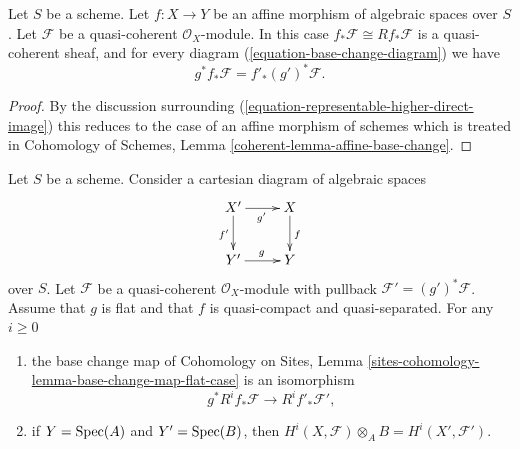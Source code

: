 \begin{lemma}
\label{lemma-affine-base-change}
Let $S$ be a scheme. Let $f : X \to Y$ be an affine morphism of algebraic
spaces over $S$. Let $\mathcal{F}$ be a quasi-coherent $\mathcal{O}_X$-module.
In this case $f_*\mathcal{F} \cong Rf_*\mathcal{F}$ is a quasi-coherent
sheaf, and for every diagram (\ref{equation-base-change-diagram})
we have
$$
g^*f_*\mathcal{F} = f'_*(g')^*\mathcal{F}.
$$
\end{lemma}

\begin{proof}
By the discussion surrounding
(\ref{equation-representable-higher-direct-image})
this reduces to the case of an affine morphism of schemes which
is treated in Cohomology of Schemes, Lemma
\ref{coherent-lemma-affine-base-change}.
\end{proof}

\begin{lemma}
\label{lemma-flat-base-change-cohomology}
Let $S$ be a scheme. Consider a cartesian diagram of algebraic spaces
$$
\xymatrix{
X' \ar[d]_{f'} \ar[r]_{g'} & X \ar[d]^f \\
Y' \ar[r]^g & Y
}
$$
over $S$.
Let $\mathcal{F}$ be a quasi-coherent $\mathcal{O}_X$-module
with pullback $\mathcal{F}' = (g')^*\mathcal{F}$.
Assume that $g$ is flat and that $f$ is quasi-compact and quasi-separated.
For any $i \geq 0$
\begin{enumerate}
\item the base change map of
Cohomology on Sites, Lemma
\ref{sites-cohomology-lemma-base-change-map-flat-case}
is an isomorphism
$$
g^*R^if_*\mathcal{F} \longrightarrow R^if'_*\mathcal{F}',
$$
\item if $Y = \mathop{\mathrm{Spec}}(A)$ and $Y' = \mathop{\mathrm{Spec}}(B)$, then
$H^i(X, \mathcal{F}) \otimes_A B = H^i(X', \mathcal{F}')$.
\end{enumerate}
\end{lemma}

